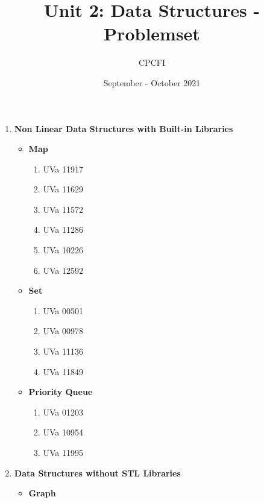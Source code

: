 \documentclass[11pt, oneside]{article}   	%
\title{Unit 2: Data Structures - Problemset}
\author{CPCFI}
\date{September - October 2021}							%
\begin{document}
\maketitle

\begin{enumerate}
    \item \textbf{Non Linear Data Structures with Built-in Libraries}
    	\begin{itemize}
		    \item \textbf{Map}
		    	\begin{enumerate}
				    \item UVa 11917
				    \item UVa 11629
				    \item UVa 11572
				    \item UVa 11286
				    \item UVa 10226					    				    						    \item UVa 12592		    
				\end{enumerate}				
		    \item \textbf{Set}
		    	\begin{enumerate}
				    \item UVa 00501
				    \item UVa 00978
				    \item UVa 11136
				    \item UVa 11849				    				    		
				\end{enumerate}
		    \item \textbf{Priority Queue}
		    	\begin{enumerate}
				    \item UVa 01203
				    \item UVa 10954
				    \item UVa 11995				    				    
				\end{enumerate}
		\end{itemize}
    \item \textbf{Data Structures without STL Libraries}
    	\begin{itemize}
		    \item \textbf{Graph}
		    	\begin{enumerate}

\end{enumerate}
\end{itemize}
\end{enumerate}
\end{document}
